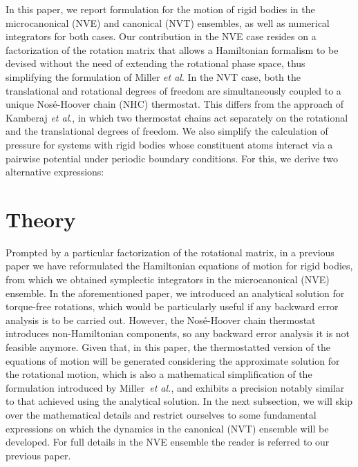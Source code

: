 \documentclass[aip,jcp,reprint,amsmath,amssymb]{revtex4-1}
\begin{document}
In this paper, we report formulation for the motion of rigid bodies in the microcanonical (NVE) and canonical (NVT) ensembles, as well as numerical integrators for both cases. Our contribution in the NVE case resides on a factorization of the rotation matrix that allows a Hamiltonian formalism to be devised without the need of extending the rotational phase space, thus simplifying the formulation of Miller \textit{et al}.\cite{Miller2002} In the NVT case, both the translational and rotational degrees of freedom are simultaneously coupled to a unique Nos\'e-Hoover chain (NHC) thermostat. This differs from the approach of Kamberaj \textit{et al}.,\cite{Kamberaj2005} in which two thermostat chains act separately on the rotational and the translational degrees of freedom. We also simplify the calculation of pressure for systems with rigid bodies whose constituent atoms interact via a pairwise potential under periodic boundary conditions. For this, we derive two alternative expressions: %


\section{Theory}

Prompted by a particular factorization of the rotational matrix, in a previous paper\cite{Abreu_2017} we have reformulated the Hamiltonian equations of motion for rigid bodies, from which we obtained symplectic integrators in the microcanonical (NVE) ensemble. In the aforementioned paper, we introduced an analytical solution for torque-free rotations, which would be particularly useful if any backward error analysis\cite{Hairer_2006} is to be carried out. However, the  Nos\'{e}-Hoover chain thermostat introduces non-Hamiltonian components, so any backward error analysis it is not feasible anymore. Given that, in this paper, the thermostatted version of the equations of motion will be generated considering the approximate solution for the rotational motion, which is also a mathematical simplification of the formulation introduced by Miller~\textit{et al.}\cite{Miller2002}, and exhibits a precision notably similar to that achieved using the analytical solution. In the next subsection, we will skip over the mathematical details and restrict ourselves to some fundamental expressions on which the dynamics in the canonical (NVT) ensemble will be developed. For full details in the NVE ensemble the reader is referred to our previous paper.\cite{Abreu_2017}
\end{document}
